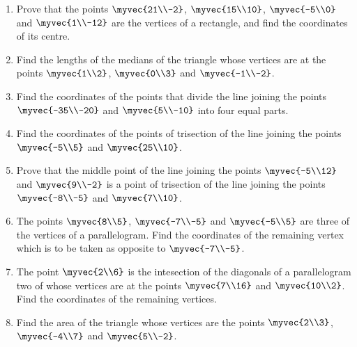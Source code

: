 \begin{enumerate}[label=\arabic*.,ref=\thesubsection.\theenumi]
\item Prove that the points $\myvec{21\\-2}$, $\myvec{15\\10}$, $\myvec{-5\\0}$  and $\myvec{1\\-12}$ are the vertices of a rectangle, and find the
coordinates of its centre.
\\
\solution

%
\item Find the lengths of the medians of the triangle whose vertices are at the points $\myvec{1\\2}$, $\myvec{0\\3}$ and $\myvec{-1\\-2}$.
\item Find the coordinates of the points that divide the line joining the points $\myvec{-35\\-20}$ and $\myvec{5\\-10}$ into four equal parts.
\item Find the coordinates of the points of trisection of the line joining the points $\myvec{-5\\5}$ and $\myvec{25\\10}$.
\item Prove that the middle point of the line joining the points $\myvec{-5\\12}$ and $\myvec{9\\-2}$ is a point of trisection of the line
joining the points $\myvec{-8\\-5}$ and $\myvec{7\\10}$.
\\
\solution

\item The points $\myvec{8\\5}$, $\myvec{-7\\-5}$ and $\myvec{-5\\5}$ are three of the vertices of a parallelogram.  Find the coordinates of
the remaining vertex which is to be taken as opposite to $\myvec{-7\\-5}$.
\item The point $\myvec{2\\6}$ is the intesection of the diagonals of a parallelogram two of whose vertices are at the points $\myvec{7\\16}$ and $\myvec{10\\2}$.
Find the coordinates of the remaining vertices.
\item Find the area of the triangle whose vertices are the points $\myvec{2\\3}$, $\myvec{-4\\7}$ and $\myvec{5\\-2}$.  

\end{enumerate}
